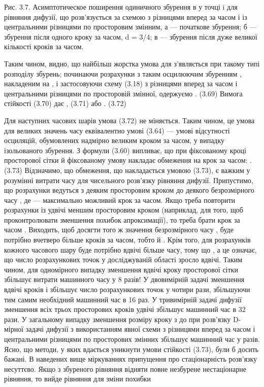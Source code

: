 Рис. 3.7. Асимптотическое поширення одиничного збурення в у точці i для рівняння дифузії, що розв'язується за схемою з різницями вперед за часом і із центральними різницями по просторовим змінним, а — початкове збурення; б — збурення після одного кроку за часом, d = 3/4;  в — збурення після дуже великої кількості кроків за часом.

Таким чином, видно, що найбільш жорстка умова для   з'являється при такому типі розподілу збурень; починаючи розрахунки з таким осцилюючим збуренням  , накладеним на , і застосовуючи схему (3.18) з різницями вперед за часом і центральними різницями по просторовій змінної, одержуємо
 .	(3.69)
Вимога стійкості
 	(3.70)
дає
 ,	(3.71)
або
 . 	(3.72)

Для наступних часових шарів умова (3.72) не міняється. Таким чином, це умова для великих значень часу еквівалентно умові (3.64) — умові відсутності осциляцій, обумовлених надмірно великим кроком за часом, у випадку ізольованого збурення.
З формули (3.60) випливає, що при фіксованому кроці просторової сітки й фіксованому   умову   накладає обмеження на крок за часом:
 . 	(3.73)
Відзначимо, що обмеження, що накладається умовою (3.73), є важким у розумінні витрати часу для чисельного розв'язку рівняння дифузії. Припустимо, що розрахунки ведуться з деяким просторовим кроком   до деякого безрозмірного часу  , де    — максимально можливий крок за часом. Якщо треба повторити розрахунки із удвічі меншим просторовим кроком   (наприклад, для того, щоб проконтролювати зменшення похибок апроксимації), то треба брати крок за часом  . Виходить, щоб досягти того ж значення безрозмірного часу  , буде потрібно вчетверо більше кроків за часом, тобто   й  . Крім того, для розрахунків кожного часового шару буде потрібно вдвічі більше часу, тому що , а це означає, що число розрахункових точок у досліджуваній області зросло вдвічі. Таким чином, для одномірного випадку зменшення вдвічі кроку просторової сітки збільшує витрати машинного часу у 8 разів!
 У двовимірній задачі зменшення вдвічі кроків   і   збільшує число розрахункових точок у чотири рази, збільшуючи тим самим необхідний машинний час в 16 раз. У тривимірній задачі дифузії зменшення всіх трьох просторових кроків удвічі збільшує машинний час в 32 рази. У загальному випадку зменшення розміру кроку з   до   при розв'язку D-мірної задачі дифузії з використанням явної схеми з різницями вперед за часом і центральними різницями по просторових змінних збільшує машинний час у   разів. Ясно, що методи, у яких вдається уникнути умови стійкості (3.73), були б досить бажані.
В наведених вище міркуваннях припущення про стаціонарність розв'язку несуттєво. Якщо з збуреного рівняння відняти повне незбурене нестаціонарне рівняння, то вийде рівняння для зміни похибки
